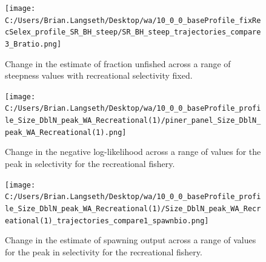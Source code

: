 \documentclass[11pt,
  english,
  a4paper,
]{article}
\begin{document}
\tagmcend\tagstructend


\begin{figure}
\centering
\texttt{[image: C:/Users/Brian.Langseth/Desktop/wa/10\_0\_0\_baseProfile\_fixRecSelex\_profile\_SR\_BH\_steep/SR\_BH\_steep\_trajectories\_compare3\_Bratio.png]}
\caption{Change in the estimate of fraction unfished across a range of steepness values with recreational selectivity fixed.\label{fig:h-recfix-depl}}
\end{figure}

\tagmcend\tagstructend


\begin{figure}
\centering
\texttt{[image: C:/Users/Brian.Langseth/Desktop/wa/10\_0\_0\_baseProfile\_profile\_Size\_DblN\_peak\_WA\_Recreational(1)/piner\_panel\_Size\_DblN\_peak\_WA\_Recreational(1).png]}
\caption{Change in the negative log-likelihood across a range of values for the peak in selectivity for the recreational fishery.\label{fig:recselex-profile}}
\end{figure}

\tagmcend\tagstructend


\begin{figure}
\centering
\texttt{[image: C:/Users/Brian.Langseth/Desktop/wa/10\_0\_0\_baseProfile\_profile\_Size\_DblN\_peak\_WA\_Recreational(1)/Size\_DblN\_peak\_WA\_Recreational(1)\_trajectories\_compare1\_spawnbio.png]}
\caption{Change in the estimate of spawning output across a range of values for the peak in selectivity for the recreational fishery.\label{fig:recselex-ssb}}
\end{figure}

\tagmcend\tagstructend

\end{document}

